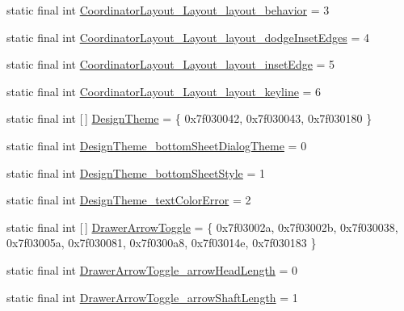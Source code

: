 \begin{DoxyCompactItemize}
\item 
static final int \mbox{\hyperlink{classandroid_1_1support_1_1design_1_1_r_1_1styleable_a497df3ffa4a96f763704dd46022df3d2}{Coordinator\+Layout\+\_\+\+Layout\+\_\+layout\+\_\+behavior}} = 3
\item 
static final int \mbox{\hyperlink{classandroid_1_1support_1_1design_1_1_r_1_1styleable_a153c15e86abfb5cb543300b63eefd5fd}{Coordinator\+Layout\+\_\+\+Layout\+\_\+layout\+\_\+dodge\+Inset\+Edges}} = 4
\item 
static final int \mbox{\hyperlink{classandroid_1_1support_1_1design_1_1_r_1_1styleable_ac5a3cdc8957c70cc66e0e7eb162a4a54}{Coordinator\+Layout\+\_\+\+Layout\+\_\+layout\+\_\+inset\+Edge}} = 5
\item 
static final int \mbox{\hyperlink{classandroid_1_1support_1_1design_1_1_r_1_1styleable_adc67bafc5ae56db3abd6ec5a003f0b9a}{Coordinator\+Layout\+\_\+\+Layout\+\_\+layout\+\_\+keyline}} = 6
\item 
static final int \mbox{[}$\,$\mbox{]} \mbox{\hyperlink{classandroid_1_1support_1_1design_1_1_r_1_1styleable_a340277a41103d3ce86cf1861cc50c1c9}{Design\+Theme}} = \{ 0x7f030042, 0x7f030043, 0x7f030180 \}
\item 
static final int \mbox{\hyperlink{classandroid_1_1support_1_1design_1_1_r_1_1styleable_a62df833170339d86a1441aecd49670c2}{Design\+Theme\+\_\+bottom\+Sheet\+Dialog\+Theme}} = 0
\item 
static final int \mbox{\hyperlink{classandroid_1_1support_1_1design_1_1_r_1_1styleable_afe1b6c829f174633cfb6f1e6885be833}{Design\+Theme\+\_\+bottom\+Sheet\+Style}} = 1
\item 
static final int \mbox{\hyperlink{classandroid_1_1support_1_1design_1_1_r_1_1styleable_a02c6796a896b6c3f54682cd0a906312f}{Design\+Theme\+\_\+text\+Color\+Error}} = 2
\item 
static final int \mbox{[}$\,$\mbox{]} \mbox{\hyperlink{classandroid_1_1support_1_1design_1_1_r_1_1styleable_a559d22c78738e5161420dc4b41689c1b}{Drawer\+Arrow\+Toggle}} = \{ 0x7f03002a, 0x7f03002b, 0x7f030038, 0x7f03005a, 0x7f030081, 0x7f0300a8, 0x7f03014e, 0x7f030183 \}
\item 
static final int \mbox{\hyperlink{classandroid_1_1support_1_1design_1_1_r_1_1styleable_a24ad965a1251127297d0ff2c9e45ee06}{Drawer\+Arrow\+Toggle\+\_\+arrow\+Head\+Length}} = 0
\item 
static final int \mbox{\hyperlink{classandroid_1_1support_1_1design_1_1_r_1_1styleable_a4e429a1922b15c56d792545c996d45d1}{Drawer\+Arrow\+Toggle\+\_\+arrow\+Shaft\+Length}} = 1

\end{DoxyCompactItemize}
